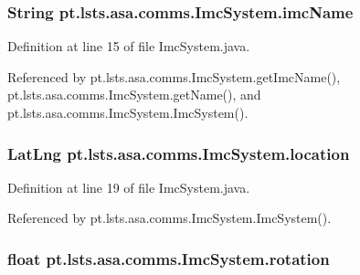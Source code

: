 \subsubsection[{imc\+Name}]{\setlength{\rightskip}{0pt plus 5cm}String pt.\+lsts.\+asa.\+comms.\+Imc\+System.\+imc\+Name\hspace{0.3cm}{\ttfamily [private]}}\label{classpt_1_1lsts_1_1asa_1_1comms_1_1ImcSystem_a035749ded821f7a8095f7174b74c904e}


Definition at line 15 of file Imc\+System.\+java.



Referenced by pt.\+lsts.\+asa.\+comms.\+Imc\+System.\+get\+Imc\+Name(), pt.\+lsts.\+asa.\+comms.\+Imc\+System.\+get\+Name(), and pt.\+lsts.\+asa.\+comms.\+Imc\+System.\+Imc\+System().

\hypertarget{classpt_1_1lsts_1_1asa_1_1comms_1_1ImcSystem_ae9e9619bacd8538ef96630499c51e762}{}
\subsubsection[{location}]{\setlength{\rightskip}{0pt plus 5cm}Lat\+Lng pt.\+lsts.\+asa.\+comms.\+Imc\+System.\+location\hspace{0.3cm}{\ttfamily [private]}}\label{classpt_1_1lsts_1_1asa_1_1comms_1_1ImcSystem_ae9e9619bacd8538ef96630499c51e762}


Definition at line 19 of file Imc\+System.\+java.



Referenced by pt.\+lsts.\+asa.\+comms.\+Imc\+System.\+Imc\+System().

\hypertarget{classpt_1_1lsts_1_1asa_1_1comms_1_1ImcSystem_a30a763c50ea85e886d882aba0efd9025}{}
\subsubsection[{rotation}]{\setlength{\rightskip}{0pt plus 5cm}float pt.\+lsts.\+asa.\+comms.\+Imc\+System.\+rotation\hspace{0.3cm}{\ttfamily [private]}}\label{classpt_1_1lsts_1_1asa_1_1comms_1_1ImcSystem_a30a763c50ea85e886d882aba0efd9025}


